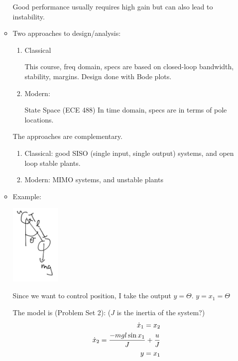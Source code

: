\begin{enumerate}
\begin{itemize}
                Good performance usually requires high gain but can also lead to instability.

                \item Two approaches to design/analysis:

                \begin{enumerate}
                    \item Classical

                        This course, freq domain, specs are based on closed-loop bandwidth, stability, margins. Design done with Bode plots.

                    \item Modern:

                        State Space (ECE 488)
                        In time domain, specs are in terms of pole locations.
                \end{enumerate}
                    The approaches are complementary.

                \begin{enumerate}

                    \item Classical: good SISO (single input, single output) systems, and open loop stable plants.

                    \item Modern: MIMO systems, and unstable plants

                \end{enumerate}

                \item Example:

                    \includegraphics[width=90px,keepaspectratio]{images/5-1.png}

                    Since we want to control position, I take the output $y = \Theta$. $y = x_1 = \Theta$

                    The model is (Problem Set 2):
                    ($J$ is the inertia of the system?)
                    \begin{align*}
                        \dot{x}_1 = x_2 \\
                        \dot{x}_2 = \frac{-mgl \sin{x_1}}{J} + \frac{u}{J} \\
                        y = x_1
                    \end{align*}


\end{itemize}
\end{enumerate}
